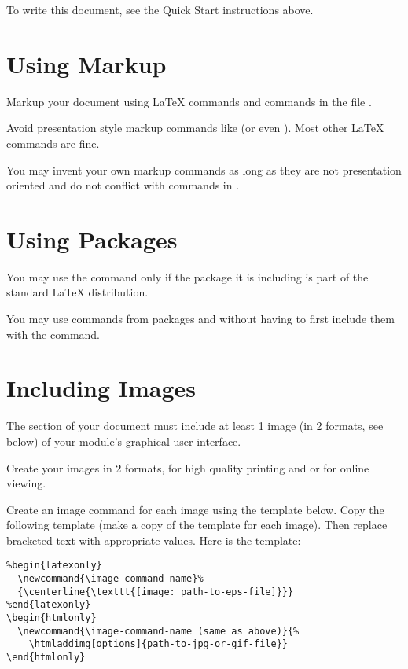 \documentclass[11pt]{article}
\begin{document}
To write this document, see the Quick Start instructions above.

\section{Using Markup}

Markup your document using \LaTeX{} commands and commands in the file
. 

Avoid presentation style markup commands like  (or even
).  Most other \LaTeX{} commands are fine.

You may invent your own markup commands as long as they are not
presentation oriented and do not conflict with commands in
.

\section{Using Packages}

You may use the  command only if the package it is
including is part of the standard \LaTeX{} distribution.  

You may use commands from packages  and
 without having to first include them with the
 command.

\section{Including Images}
\label{sec:inclimg}

The  section of your document must include at least 1
image (in 2 formats, see below) of your module's graphical user interface.

Create your images in 2 formats,  for
high quality printing and  or  for online
viewing. 

Create an image command for each image using the template below.  Copy the
following template (make a copy of the template for each image).  Then
replace bracketed text with appropriate values.  Here is the template:

\begin{verbatim}
%begin{latexonly}
  \newcommand{\image-command-name}%
  {\centerline{\texttt{[image: path-to-eps-file]}}}
%end{latexonly}
\begin{htmlonly}
  \newcommand{\image-command-name (same as above)}{%
    \htmladdimg[options]{path-to-jpg-or-gif-file}}
\end{htmlonly}
\end{verbatim}
\end{document}
